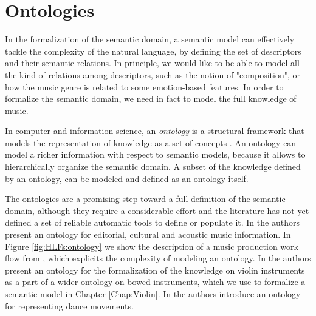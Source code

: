 \section{Ontologies}\label{sec:HLFs:ontology}
In the formalization of the semantic domain, a semantic model can effectively tackle the complexity of the natural language, by defining the set of descriptors and their semantic relations. In principle, we would like to be able to model all the kind of relations among descriptors, such as the notion of "composition", or how the music genre is related to some emotion-based features. In order to formalize the semantic domain, we need in fact to model the full knowledge of music. 

In computer and information science, an \textit{ontology} is a structural framework that models the representation of knowledge as a set of concepts \cite{Bechhofer2009}. An ontology can model a richer information with respect to semantic models, because it allows to hierarchically organize the semantic domain. A subset of the knowledge defined by an ontology, can be modeled and defined as an ontology itself.

The ontologies are a promising step toward a full definition of the semantic domain, although they require a considerable effort and the literature has not yet defined a set of reliable automatic tools to define or populate it. In \cite{Raimond2007} the authors present an ontology for editorial, cultural and acoustic music information. In Figure \ref{fig:HLFs:ontology} we show the description of a music production work flow from \cite{Raimond2007}, which explicits the complexity of modeling an ontology. In \cite{Zanoni2014} the authors present an ontology for the formalization of the knowledge on violin instruments as a part of a wider ontology on bowed instruments, which we use to formalize a semantic model in Chapter \ref{Chap:Violin}. In \cite{ElRaheb2012} the authors introduce an ontology for representing dance movements.  

